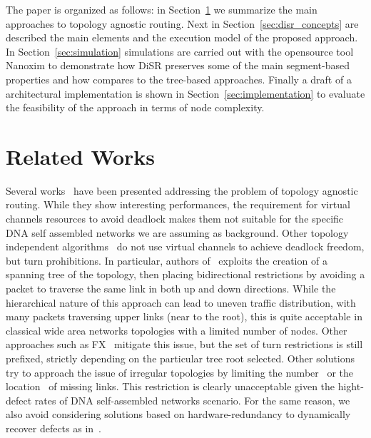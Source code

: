 The paper is organized as follows: in Section~\ref{sec:related_works}
we summarize the main approaches to topology agnostic routing. Next in
Section~\ref{sec:disr_concepts} are described the main elements and
the execution model of the proposed approach.  In Section~\ref{sec:simulation}
simulations are carried out with the opensource tool Nanoxim to
demonstrate how DiSR preserves some of the main segment-based
properties and how compares to the tree-based approaches. Finally a
draft of a architectural implementation is shown in
Section~\ref{sec:implementation} to evaluate the feasibility of the
approach in terms of node complexity.

\section{Related Works}
\label{sec:related_works}
Several works~\cite{sancho2002, skeie2002, skeie2004, koibuchi2003} have been presented addressing the problem of topology
agnostic routing. While they show interesting
performances, the requirement for virtual channels resources 
to avoid deadlock makes them not suitable for the specific DNA self
assembled networks we are assuming as background.
Other topology independent algorithms~\cite{schroeder1991, koibuchi2001, cherkasova1996} do not use virtual channels to
achieve deadlock freedom, but turn prohibitions. 
In particular, authors of~\cite{Patwardhan05evaluatingthe} exploits the creation of a spanning tree of the
topology, then placing bidirectional restrictions by avoiding a packet
to traverse the same link in both up and down directions.
While the hierarchical nature of this approach can lead to uneven traffic
distribution, with many packets traversing upper links (near to the
root), this is quite acceptable in classical wide area networks
topologies with a limited number of nodes. Other approaches such as
FX~\cite{sancho2000} mitigate this
issue, but the set of turn restrictions is still prefixed,
strictly depending on the particular tree root selected. 
Other solutions try to approach the issue of irregular
topologies by limiting the number~\cite{dally1994, duato1997, gomez2004, koibuchi2008} or the
location~\cite{zhang2008, sui2000, flich2008, liu2011} of missing links. This
restriction is clearly unacceptable given the hight-defect rates of
DNA self-assembled networks scenario. For the same reason, we also
avoid considering solutions based on hardware-redundancy to
dynamically recover defects as in~\cite{constantinides2006, kohler2010, kim2006, park2006, ebrahimi2013}. 

